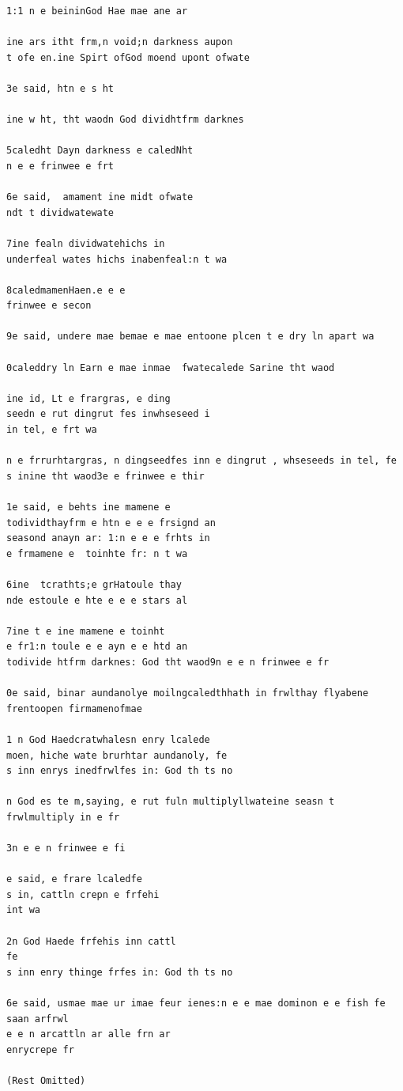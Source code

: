 \documentclass[11pt]{article}
\begin{document}
\begin{lstlisting}
1:1 n e beininGod Hae mae ane ar

ine ars itht frm,n void;n darkness aupon
t ofe en.ine Spirt ofGod moend upont ofwate

3e said, htn e s ht

ine w ht, tht waodn God dividhtfrm darknes

5caledht Dayn darkness e caledNht
n e e frinwee e frt

6e said,  amament ine midt ofwate
ndt t dividwatewate

7ine fealn dividwatehichs in
underfeal wates hichs inabenfeal:n t wa

8caledmamenHaen.e e e
frinwee e secon

9e said, undere mae bemae e mae entoone plcen t e dry ln apart wa

0caleddry ln Earn e mae inmae  fwatecalede Sarine tht waod

ine id, Lt e frargras, e ding
seedn e rut dingrut fes inwhseseed i
in tel, e frt wa

n e frrurhtargras, n dingseedfes inn e dingrut , whseseeds in tel, fe
s inine tht waod3e e frinwee e thir

1e said, e behts ine mamene e
todividthayfrm e htn e e e frsignd an
seasond anayn ar: 1:n e e e frhts in
e frmamene e  toinhte fr: n t wa

6ine  tcrathts;e grHatoule thay
nde estoule e hte e e e stars al

7ine t e ine mamene e toinht
e fr1:n toule e e ayn e e htd an
todivide htfrm darknes: God tht waod9n e e n frinwee e fr

0e said, binar aundanolye moilngcaledthhath in frwlthay flyabene frentoopen firmamenofmae

1 n God Haedcratwhalesn enry lcalede
moen, hiche wate brurhtar aundanoly, fe
s inn enrys inedfrwlfes in: God th ts no

n God es te m,saying, e rut fuln multiplyllwateine seasn t frwlmultiply in e fr

3n e e n frinwee e fi

e said, e frare lcaledfe
s in, cattln crepn e frfehi
int wa

2n God Haede frfehis inn cattl
fe
s inn enry thinge frfes in: God th ts no

6e said, usmae mae ur imae feur ienes:n e e mae dominon e e fish fe saan arfrwl
e e n arcattln ar alle frn ar
enrycrepe fr

(Rest Omitted)

\end{lstlisting}
\end{document}

